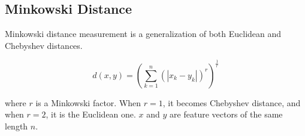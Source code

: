 \subsection{Minkowski Distance}

Minkowski distance measurement is a generalization of both Euclidean
and Chebyshev distances.

$$ d(x,y) = \left(\displaystyle\sum_{k=1}^{n}(|x_{k}-y_{k}|)^{r}\right)^\frac{1}{r} $$

\noindent
where $r$ is a Minkowski factor. When $r=1$, it becomes Chebyshev distance,
and when $r=2$, it is the Euclidean one. $x$ and $y$ are feature vectors of the same length $n$.
